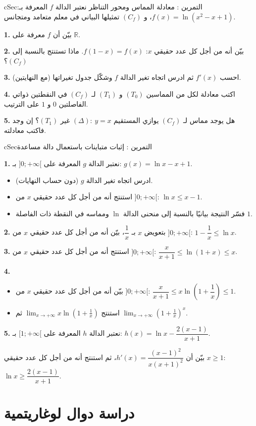 \documentclass[12pt,a4paper]{article}
\newenvironment{BOX}[2]{\begin{otherlanguage}{english}\begin{arbox}{#1}{#2}}{\end{arbox}\end{otherlanguage}}
\newcounter{exo}
\newenvironment{tamrin}[1]{\stepcounter{exo}\begin{BOX}{cSec}{التمرين \theexo: #1}}{\end{BOX}}
\newcommand{\R}{\mathbb{R}}
\newenvironment{sq}{\begin{itemize}[leftmargin=2.4em,itemsep=3pt]}{\end{itemize}}
\newcommand{\qa}{\item[(أ)]}\newcommand{\qb}{\item[(ب)]}\newcommand{\qc}{\item[(جـ)]}\newcommand{\qd}{\item[(د)]}\newcommand{\qe}{\item[(هـ)]}
\newcommand{\QQ}[1]{\par\smallskip\textbf{#1.} }
\begin{document}
\begin{tamrin}{معادلة المماس ومحور التناظر}
نعتبر الدالة $f$ المعرفة بـ: $f(x)=\ln\left(x^2-x+1\right)$، و $(C_f)$ تمثيلها البياني في معلم متعامد ومتجانس.
\QQ{1} بيّن أن $f$ معرفة على $\R$.
\QQ{2} بيّن أنه من أجل كل عدد حقيقي $x$: $f(1-x)=f(x)$. ماذا تستنتج بالنسبة إلى $(C_f)$؟
\QQ{3} احسب $f'(x)$ ثم ادرس اتجاه تغير الدالة $f$ وشكّل جدول تغيراتها (مع النهايتين).
\QQ{4} اكتب معادلة لكل من المماسين $(T_0)$ و $(T_1)$ لـ $(C_f)$ في النقطتين ذواتي الفاصلتين $0$ و $1$ على الترتيب.
\QQ{5} هل يوجد مماس لـ $(C_f)$ يوازي المستقيم $(\Delta):\ y=x$ غير $(T_1)$؟ إن وجد فاكتب معادلته.
\end{tamrin}

\begin{tamrin}{إثبات متباينات باستعمال دالة مساعدة}
\QQ{1} نعتبر الدالة $g$ المعرفة على $]0;+\infty[$ بـ: $g(x)=\ln x-x+1$.
\begin{sq}
\qa ادرس اتجاه تغير الدالة $g$ (دون حساب النهايات).
\qb استنتج أنه من أجل كل عدد حقيقي $x$ من $]0;+\infty[$: $\ln x\leqslant x-1$.
\qc فسّر النتيجة بيانيًا بالنسبة إلى منحنى الدالة $\ln$ ومماسه في النقطة ذات الفاصلة $1$.
\end{sq}
\QQ{2} بتعويض $x$ بـ $\dfrac1x$، بيّن أنه من أجل كل عدد حقيقي $x$ من $]0;+\infty[$: $1-\dfrac1x\leqslant\ln x$.
\QQ{3} استنتج أنه من أجل كل عدد حقيقي $x$ من $]0;+\infty[$: $\dfrac{x}{x+1}\leqslant\ln(1+x)\leqslant x$.
\QQ{4}
\begin{sq}
\qa بيّن أنه من أجل كل عدد حقيقي $x$ من $]0;+\infty[$: $\dfrac{x}{x+1}\leqslant x\ln\left(1+\dfrac1x\right)\leqslant 1$.
\qb استنتج $\displaystyle\lim_{x\to+\infty}x\ln\left(1+\frac1x\right)$ ثم $\displaystyle\lim_{x\to+\infty}\left(1+\frac1x\right)^{x}$.
\end{sq}
\QQ{5} نعتبر الدالة $h$ المعرفة على $[1;+\infty[$ بـ: $h(x)=\ln x-\dfrac{2(x-1)}{x+1}$.

بيّن أن $h'(x)=\dfrac{(x-1)^2}{x(x+1)^2}$، ثم استنتج أنه من أجل كل عدد حقيقي $x\geqslant1$: $\ln x\geqslant\dfrac{2(x-1)}{x+1}$.
\end{tamrin}

\section{دراسة دوال لوغاريتمية}
\end{document}
